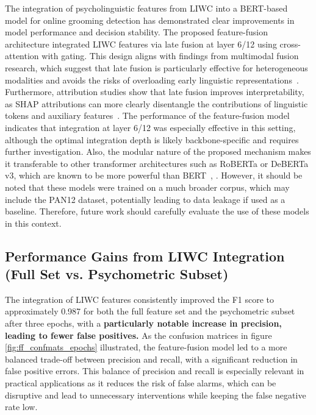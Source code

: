 The integration of psycholinguistic features from LIWC into a BERT-based model for online grooming detection has demonstrated clear improvements in model performance and decision stability. The proposed feature-fusion architecture integrated LIWC features via late fusion at layer 6/12 using cross-attention with gating. This design aligns with findings from multimodal fusion research, which suggest that late fusion is particularly effective for heterogeneous modalities and avoids the risks of overloading early linguistic representations~\cite{shankar2022progressivefusion}. Furthermore, attribution studies show that late fusion improves interpretability, as SHAP attributions can more clearly disentangle the contributions of linguistic tokens and auxiliary features~\cite{shapcat2024interpretable}. The performance of the feature-fusion model indicates that integration at layer 6/12 was especially effective in this setting, although the optimal integration depth is likely backbone-specific and requires further investigation. Also, the modular nature of the proposed mechanism makes it transferable to other transformer architectures such as RoBERTa or DeBERTa v3, which are known to be more powerful than BERT~\cite{liu2019roberta}, \cite{he2023debertav3}. However, it should be noted that these models were trained on a much broader corpus, which may include the PAN12 dataset, potentially leading to data leakage if used as a baseline. Therefore, future work should carefully evaluate the use of these models in this context.

\subsection{Performance Gains from LIWC Integration (Full Set vs. Psychometric Subset)}

The integration of LIWC features consistently improved the F1 score to approximately 0.987 for both the full feature set and the psychometric subset after three epochs, with a \textbf{particularly notable increase in precision, leading to fewer false positives.} As the confusion matrices in figure \ref{fig:ff_confmats_epochs} illustrated, the feature-fusion model led to a more balanced trade-off between precision and recall, with a significant reduction in false positive errors. This balance of precision and recall is especially relevant in practical applications as it reduces the risk of false alarms, which can be disruptive and lead to unnecessary interventions while keeping the false negative rate low. 

